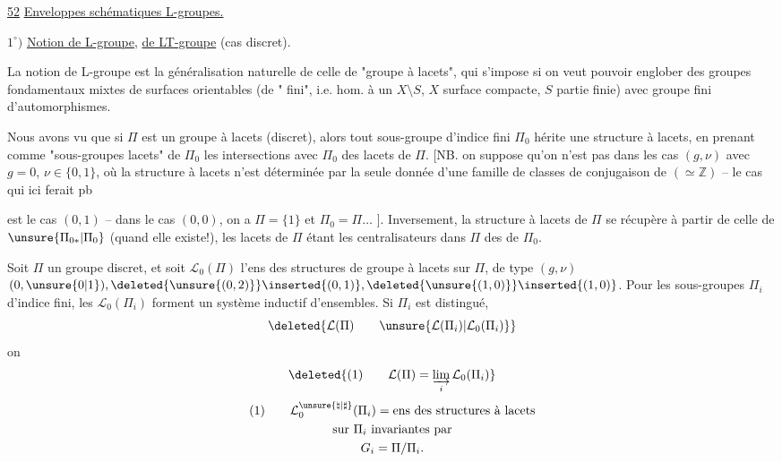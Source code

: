 
\uline{52}\qquad
\uline{Enveloppes schématiques  L-groupes.}

$1^\circ)$ \uline{Notion de L-groupe}, \uline{de LT-groupe} (cas discret).

La notion de L-groupe est la généralisation
naturelle de celle de "groupe à lacets",
qui s'impose si on veut pouvoir englober
des groupes fondamentaux mixtes de
surfaces orientables (de " fini", i.e.
hom. à un $X\setminus S$, $X$ surface compacte,
$S$ partie finie) avec groupe fini d'automorphismes.

Nous avons vu que si $\Pi$ est un
groupe à lacets (discret), alors tout sous-groupe
d'indice fini $\Pi_0$ hérite une
structure à lacets, en prenant comme
"sous-groupes lacets" de $\Pi_0$ les intersections
avec $\Pi_0$ des  lacets de $\Pi$. [NB. on
suppose qu'on n'est pas dans les cas
$(g,\nu)$  avec $g=0$, $\nu\in\{0,1\}$, où la structure à lacets
n'est  déterminée par la seule donnée d'une
famille de classes de conjugaison de 
 $(\simeq\mathbb Z)$ -- le  cas qui ici ferait pb


est le cas $(0,1)$  -- dans le cas $(0,0)$, on a $\Pi=\{1\}$
et $\Pi_0=\Pi\ldots$ ]. Inversement, la structure
à lacets de $\Pi$ se récupère à partir de
celle de $\unsure{\Pi_{0*}|\Pi_0}$ (quand elle existe!), les
 lacets de $\Pi$ étant les centralisateurs
dans $\Pi$ des  de $\Pi_0$.

Soit $\Pi$ un groupe discret,
 et
soit $\mathcal L_0(\Pi)$ l'ens des structures de groupe
à lacets sur $\Pi$, de type $(g,\nu)$
$(0,\unsure{0|1}),
\deleted{\unsure{(0,2)}}\inserted{(0,1)},
\deleted{\unsure{(1,0)}}\inserted{(1,0)}$.
Pour les sous-groupes  $\Pi_i$  d'indice fini,
les $\mathcal L_0(\Pi_i)$ forment un système inductif
d'ensembles.  Si $\Pi_i$ est distingué,
\[
\deleted{\mathcal L(\Pi)\qquad
\unsure{\mathcal L(\Pi_i)|\mathcal L_0(\Pi_i)}}
\]
on  
\[
\deleted{\text{(1)}\qquad
\mathcal L(\Pi)=\varinjlim_i\mathcal L_0(\Pi_i)}
\]
\[
\begin{gathered}
\text{(1)}\qquad
\mathcal L_0^{\unsure{\natural|\sharp}}(\Pi_i)=
\text{ens des structures à lacets}\\
\text{sur }\Pi_i\text{ invariantes par}\\
G_i=\Pi/\Pi_i.
\end{gathered}
\]

